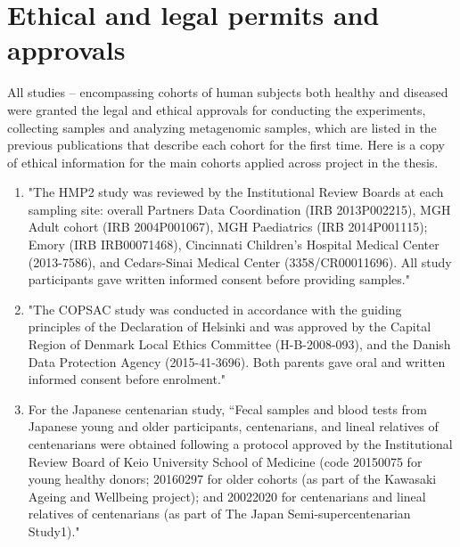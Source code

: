 \chapter{Ethical and legal permits and approvals}

All studies – encompassing cohorts of human subjects both healthy and diseased were granted the legal and ethical approvals for conducting the experiments, collecting samples and analyzing metagenomic samples, which are listed in the previous publications that describe each cohort for the first time. Here is a copy of ethical information for the main cohorts applied across project in the thesis.

\begin{enumerate}
    \item "The HMP2 study was reviewed by the Institutional Review Boards at each sampling site: overall Partners Data Coordination (IRB 2013P002215), MGH Adult cohort (IRB 2004P001067), MGH Paediatrics (IRB 2014P001115); Emory (IRB IRB00071468), Cincinnati Children’s Hospital Medical Center (2013-7586), and Cedars-Sinai Medical Center (3358/CR00011696). All study participants gave written informed consent before providing samples." \cite{Lloyd-Price2019-cw}
    \item "The COPSAC study was conducted in accordance with the guiding principles of the Declaration of Helsinki and was approved by the Capital Region of Denmark Local Ethics Committee (H-B-2008-093), and the Danish Data Protection Agency (2015-41-3696). Both parents gave oral and written informed consent before enrolment." \cite{Shah_undated-vc}
    \item For the Japanese centenarian study, “Fecal samples and blood tests from Japanese young and older participants, centenarians, and lineal relatives of centenarians were obtained following a protocol approved by the Institutional Review Board of Keio University School of Medicine (code 20150075 for young healthy donors; 20160297 for older cohorts (as part of the Kawasaki Ageing and Wellbeing project); and 20022020 for centenarians and lineal relatives of centenarians (as part of The Japan Semi-supercentenarian Study1)." \cite{Sato2021-zh}
\end{enumerate}